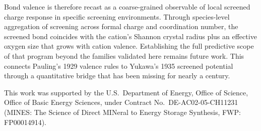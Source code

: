 \documentclass[aps,prmaterials,twocolumn,10pt,superscriptaddress,floatfix]{revtex4-2}
\begin{document}
Bond valence is therefore recast as a coarse-grained observable of
local screened charge response in specific screening environments. 
Through species-level aggregation of screening across formal charge 
and coordination number, the screened bond coincides 
with the cation's Shannon crystal radius plus an effective oxygen size that grows with cation
valence.  Establishing the full predictive scope of that program beyond the families
validated here remains future work.  This connects Pauling's 1929
valence rules \cite{Pauling1929} to Yukawa's 1935 screened potential
\cite{Yukawa1935} through a quantitative bridge that has been
missing for nearly a century.

\begin{acknowledgments}
This work was supported by the U.S.\ Department of Energy, Office of Science,
Office of Basic Energy Sciences, under Contract No.\ DE-AC02-05-CH11231
(MINES: The Science of Direct MINeral to Energy Storage Synthesis, FWP: FP00014914).
\end{acknowledgments}


\end{document}
